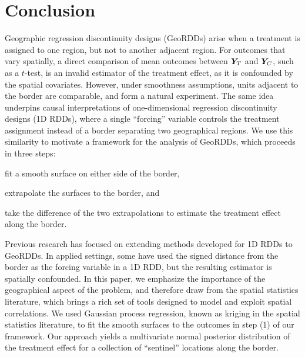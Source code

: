 \section{Conclusion}

Geographic regression discontinuity designs (GeoRDDs) arise when a treatment is assigned to one region, but not to another adjacent region.
For outcomes that vary spatially, a direct comparison of mean outcomes between \(\bm{Y}_{T}\) and \(\bm{Y}_{C}\), such as a \(t\)-test, is an invalid estimator of the treatment effect, as it is confounded by the spatial covariates.
However, under smoothness assumptions, units adjacent to the border are comparable, and form a natural experiment.
The same idea underpins causal interpretations of one-dimensional regression discontinuity designs (1D RDDs), where a single ``forcing'' variable controls the treatment assignment instead of a border separating two geographical regions.
We use this similarity to motivate a framework for the analysis of GeoRDDs, which proceeds in three steps:
\begin{flatlist} 
\item fit a smooth surface on either side of the border,
\item extrapolate the surfaces to the border, and 
\item take the difference of the two extrapolations to estimate the treatment effect along the border.
\end{flatlist}

Previous research has focused on extending methods developed for 1D RDDs to GeoRDDs.
In applied settings, some have used the signed distance from the border as the forcing variable in a 1D RDD, but the resulting estimator is spatially confounded.
In this paper, we emphasize the importance of the geographical aspect of the problem, and therefore draw from the spatial statistics literature, which brings a rich set of tools designed to model and exploit spatial correlations.
We used Gaussian process regression, known as kriging in the spatial statistics literature, to fit the smooth surfaces to the outcomes in step (1) of our framework.
Our approach yields a multivariate normal posterior distribution of the treatment effect for a collection of ``sentinel'' locations along the border.

